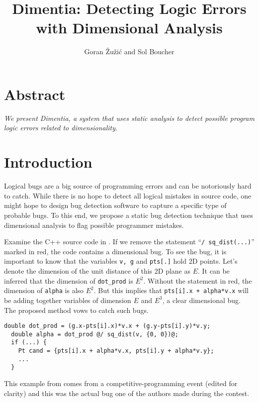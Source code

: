 \documentclass[12pt]{article}
\title{\Large Dimentia: Detecting Logic Errors with Dimensional Analysis}
\author{Goran \v{Z}u\v{z}i\'c and Sol Boucher}
\begin{document}
\maketitle

\section*{Abstract}

\textit{We present \textnormal{Dimentia}, a system that uses static analysis to detect possible program logic errors related to dimensionality.}

\section{Introduction}

Logical bugs are a big source of programming errors and can be notoriously hard to catch. While there is no hope to detect all logical mistakes in source code, one might hope to design bug detection software to capture a specific type of probable bugs. To this end, we propose a static bug detection technique that uses dimensional analysis to flag possible programmer mistakes.

Examine the C++ source code in . If we remove the statement ``\texttt{/ sq\_dist(...)}'' marked in red, the code contains a dimensional bug. To see the bug, it is important to know that the variables \texttt{v, g} and \texttt{pts[.]} hold 2D points. Let's denote the dimension of the unit distance of this 2D plane as $E$. It can be inferred that the dimension of \texttt{dot\_prod} is $E^2$. Without the statement in red, the dimension of \texttt{alpha} is also $E^2$. But this implies that \texttt{pts[i].x + alpha*v.x} will be adding together variables of dimension $E$ and $E^3$, a clear dimensional bug. The proposed method vows to catch such bugs.

\begin{lstlisting}[label=code:example1,caption=Example of a dimensional bug]
  double dot_prod = (g.x-pts[i].x)*v.x + (g.y-pts[i].y)*v.y;
  double alpha = dot_prod @/ sq_dist(v, {0, 0})@;
  if (...) {
    Pt cand = {pts[i].x + alpha*v.x, pts[i].y + alpha*v.y};
    ...
  }
\end{lstlisting}

This example from  comes from a competitive-programming event (edited for clarity) and this was the actual bug one of the authors made during the contest. %
\end{document}

